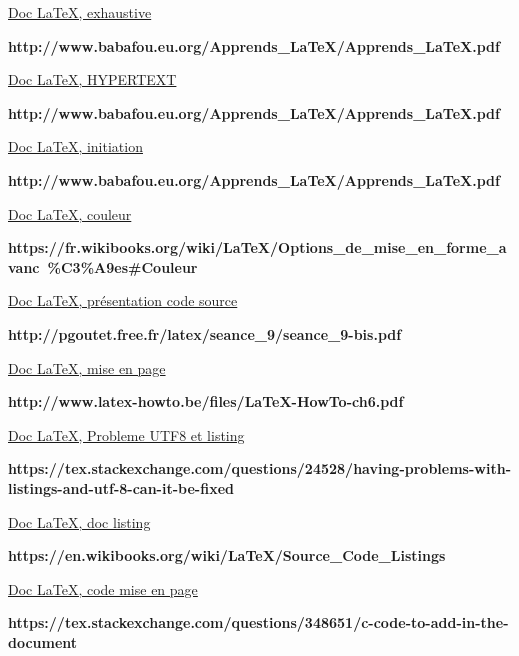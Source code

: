 \documentclass[a4paper]{article}
\begin{document}
\href{http://www.babafou.eu.org/Apprends_LaTeX/Apprends_LaTeX.pdf}{Doc \LaTeX , exhaustive}

\textbf{http://www.babafou.eu.org/Apprends\_LaTeX/Apprends\_LaTeX.pdf\\}

\href{https://fr.sharelatex.com/learn/Hyperlinks}{Doc \LaTeX , HYPERTEXT}

\textbf{http://www.babafou.eu.org/Apprends\_LaTeX/Apprends\_LaTeX.pdf\\}

\href{ftp://ftp.dante.de/tex-archive/info/guide-latex-fr/Guide_FR.pdf}{Doc \LaTeX , initiation}

\textbf{http://www.babafou.eu.org/Apprends\_LaTeX/Apprends\_LaTeX.pdf\\}

\href{https://fr.wikibooks.org/wiki/LaTeX/Options_de_mise_en_forme_avanc%C3%A9es#Couleur}{Doc \LaTeX , couleur}

\textbf{https://fr.wikibooks.org/wiki/LaTeX/Options\_de\_mise\_en\_forme\_avanc\
\%C3\%A9es\#Couleur\\}

\href{http://pgoutet.free.fr/latex/seance_9/seance_9-bis.pdf}{Doc \LaTeX , présentation code source}

\textbf{http://pgoutet.free.fr/latex/seance\_9/seance\_9-bis.pdf}

\href{http://www.latex-howto.be/files/LaTeX-HowTo-ch6.pdf}{Doc \LaTeX , mise en page}

\textbf{http://www.latex-howto.be/files/LaTeX-HowTo-ch6.pdf\\}


\href{https://tex.stackexchange.com/questions/24528/having-problems-with-listings-and-utf-8-can-it-be-fixed}{Doc \LaTeX , Probleme UTF8 et listing}

\textbf{https://tex.stackexchange.com/questions/24528/having-problems-with-listings-and-utf-8-can-it-be-fixed}

\href{https://en.wikibooks.org/wiki/LaTeX/Source_Code_Listings}{Doc \LaTeX , doc listing}

\textbf{https://en.wikibooks.org/wiki/LaTeX/Source\_Code\_Listings\\}

\href{https://tex.stackexchange.com/questions/348651/c-code-to-add-in-the-document
}{Doc \LaTeX , code mise en page}

\textbf{https://tex.stackexchange.com/questions/348651/c-code-to-add-in-the-document\\}
\end{document}
